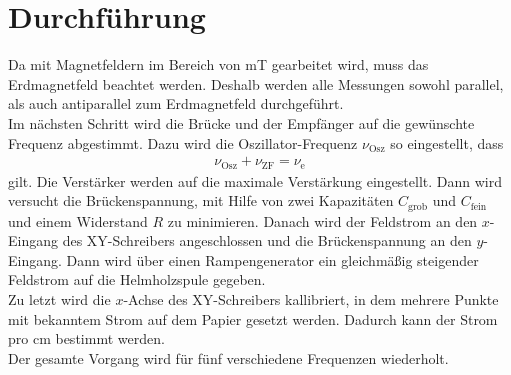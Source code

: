 \section{Durchführung}
Da mit Magnetfeldern im Bereich von mT gearbeitet wird, muss das Erdmagnetfeld beachtet werden. Deshalb werden alle Messungen sowohl parallel, als auch antiparallel zum Erdmagnetfeld durchgeführt. \\
Im nächsten Schritt wird die Brücke und der Empfänger auf die gewünschte Frequenz abgestimmt. Dazu wird die  Oszillator-Frequenz $\nu_\text{Osz}$ so eingestellt, dass
\begin{align}
  \nu_\text{Osz} + \nu_\text{ZF} = \nu_\text{e}
\end{align}
gilt. Die Verstärker werden auf die maximale Verstärkung eingestellt. Dann wird versucht die Brückenspannung, mit Hilfe von zwei Kapazitäten $C_\text{grob}$ und $C_\text{fein}$ und einem Widerstand $R$ zu minimieren. Danach wird der Feldstrom an den $x$-Eingang des XY-Schreibers angeschlossen und die Brückenspannung an den $y$-Eingang. Dann wird über einen Rampengenerator ein gleichmäßig steigender Feldstrom auf die Helmholzspule gegeben. \\
Zu letzt wird die $x$-Achse des XY-Schreibers kallibriert, in dem mehrere Punkte mit bekanntem Strom auf dem Papier gesetzt werden. Dadurch kann der Strom pro cm bestimmt werden. \\
Der gesamte Vorgang wird für fünf verschiedene Frequenzen wiederholt.
